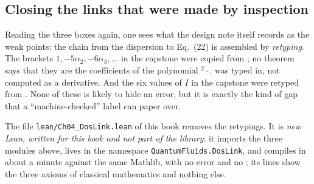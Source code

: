 \subsection{Closing the links that were made by inspection}\label{ch04:sec-newlean}
Reading the three boxes again, one sees what the design note itself records as the weak points: the chain from the dispersion to Eq.~(22) is assembled by \emph{retyping}.
The brackets $1,-5\alpha_2,-6\alpha_3,\dots$ in the capstone were copied from ; no theorem says that they are the coefficients of the polynomial $^2\cdot$.
 was typed in, not computed as a derivative.
And the six values of $I$ in the capstone were retyped from .
None of these is likely to hide an error, but it is exactly the kind of gap that a ``machine-checked'' label can paper over.


The file \texttt{lean/Ch04\_DosLink.lean} of this book removes the retypings.
It is \emph{new Lean, written for this book and not part of the library}: it imports the three modules above, lives in the namespace \texttt{QuantumFluids.DosLink}, and compiles in about a minute against the same Mathlib, with no error and no ; its  lines show the three axioms of classical mathematics and nothing else.

